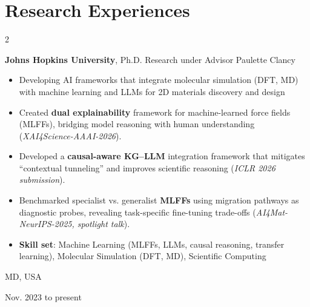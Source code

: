 \documentclass[10pt, letterpaper]{article}
\newenvironment{highlights}{
    \begin{itemize}[
        topsep=0.10 cm,
        parsep=0.10 cm,
        partopsep=0pt,
        itemsep=0pt,
        leftmargin=0.4 cm + 10pt
    ]
}{
    \end{itemize}
} %
\newenvironment{twocolentry}[2][]{
    \onecolentry
    \def\secondColumn{#2}
    \setcolumnwidth{\fill, 4.5 cm}
    \begin{paracol}{2}
}{
    \switchcolumn \raggedleft \secondColumn
    \end{paracol}
    \endonecolentry
} %
\newenvironment{threecolentry}[3][]{
    \onecolentry
    \def\thirdColumn{#3}
    \setcolumnwidth{1 cm, \fill, 4.5 cm}
    \begin{paracol}{3}
    {\raggedright #2} \switchcolumn
}{
    \switchcolumn \raggedleft \thirdColumn
    \end{paracol}
    \endonecolentry
} %
\let\hrefWithoutArrow\href
\renewcommand{\href}[2]{\hrefWithoutArrow{#1}{\mbox{\ifthenelse{\equal{#2}{}}{ }{#2 }\raisebox{.15ex}{\footnotesize \faExternalLink*}}}}
\begin{document}


    \section{Research Experiences}

\begin{twocolentry}{
MD, USA

Nov. 2023 to present

}
\textbf{Johns Hopkins University}, Ph.D. Research under Advisor Paulette Clancy
\begin{highlights}
\item Developing AI frameworks that integrate molecular simulation (DFT, MD) with machine learning and LLMs for 2D materials discovery and design
\item Created \textbf{dual explainability }framework for machine-learned force fields (MLFFs), bridging model reasoning with human understanding (\textit{XAI4Science-AAAI-2026}).
\item Developed a \textbf{causal-aware KG–LLM }integration framework that mitigates “contextual tunneling” and improves scientific reasoning (\textit{ICLR 2026 submission}).
\item Benchmarked specialist vs. generalist\textbf{ MLFFs} using migration pathways as diagnostic probes, revealing task-specific fine-tuning trade-offs (\textit{AI4Mat-NeurIPS-2025, spotlight talk}).

\item \textbf{Skill set}: Machine Learning (MLFFs, LLMs, causal reasoning, transfer learning), Molecular Simulation (DFT, MD), Scientific Computing 
\end{highlights}
\end{twocolentry}
\vspace{0.2 cm}
\end{document}
